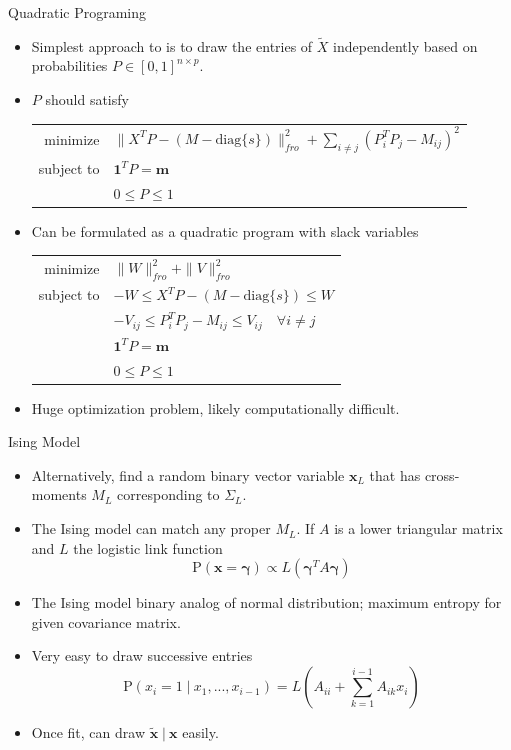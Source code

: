 \documentclass{beamer}
\newcommand{\p}{\mathrm{P}}
\newcommand{\st}{ \; \big | \:}
\newcommand{\diag}[1]{\mathrm{diag}\{#1\}}
\begin{document}
\begin{frame}{Quadratic Programing}
    \begin{itemize} 
        \item Simplest approach to is to draw the entries of $\tilde X$ independently based on probabilities $P\in[0,1]^{n\times p}$.
        \item $P$ should satisfy 
            \begin{center}
                \begin{tabular}{r l}
                    minimize     & $\|X^TP-(M-\diag{s})\|_{fro}^2 + \sum_{i\neq j}(P_i^T P_j - M_{ij})^2 $\\
                    subject to   & $ \mathbf 1^T P = \mathbf m $ \\
                                 & $0 \leq P \leq 1$
                \end{tabular} 
            \end{center}
        \item Can be formulated as a quadratic program with slack variables
            \begin{center}
                \begin{tabular}{r l}
                    minimize     & $\|W\|_{fro}^2 + \|V\|_{fro}^2 $ \\
                    subject to   & $ -W \leq X^TP-(M-\diag{s})\leq W $ \\
                                 & $ -V_{ij} \leq P_i^T P_j - M_{ij} \leq V_{ij} \quad \forall i\neq j$ \\
                                 & $ \mathbf 1^T P = \mathbf m $ \\
                                 & $0 \leq P \leq 1$
                \end{tabular} 
            \end{center}
        \item Huge optimization problem, likely computationally difficult.
    \end{itemize}
\end{frame}

\begin{frame}{Ising Model}
    \begin{itemize}
        \item Alternatively, find a random binary vector variable $\mathbf{x}_L$ that has cross-moments $M_L$ corresponding to $\Sigma_L$.
        \item The Ising model can match any proper $M_L$. If $A$ is a lower triangular matrix and $L$ the logistic link function
            \[ \p(\mathbf x=\mathbf \gamma) \propto L(\mathbf{\gamma}^T A\mathbf \gamma)\]
        \item The Ising model binary analog of normal distribution; maximum entropy for given covariance matrix.
        \item Very easy to draw successive entries
            \[ \p(x_{i}=1\st x_{1},...,x_{i-1}) = L\left(A_{ii}+\sum_{k=1}^{i-1}A_{ik}x_i\right) \]
        \item Once fit, can draw $\mathbf{\tilde x}\st \mathbf x$ easily.

    \end{itemize}
\end{frame}
\end{document}
